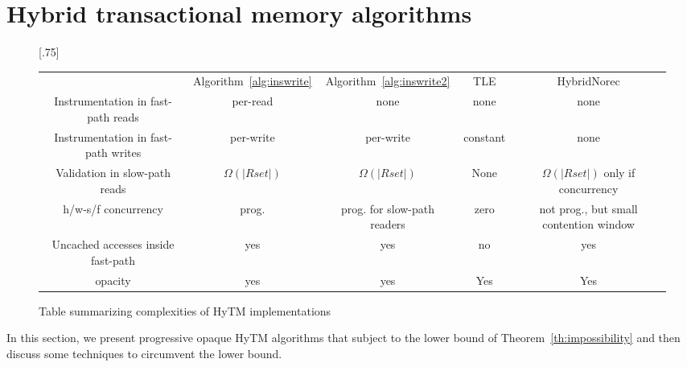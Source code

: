 \section{Hybrid transactional memory algorithms}\label{sec:hytmalgos}
%
\begin{figure*}[!t]
      
     \scalebox{.75}[.75]{
     \begin{tabularx}{\textwidth}{c|c|c|c|c}
	~~~~~ & Algorithm~\ref{alg:inswrite} & Algorithm~\ref{alg:inswrite2} & TLE & HybridNorec\\ 
	Instrumentation in fast-path reads & per-read & none & none & none \\ 
	Instrumentation in fast-path writes & per-write & per-write & constant & none \\ 
	Validation in slow-path reads & $\Omega(|Rset|)$ & $\Omega(|Rset|)$ & None & $\Omega(|Rset|)$ only if concurrency \\ 
	h/w-s/f concurrency & prog. & prog. for slow-path readers & zero & not prog., but small contention window \\ 
	Uncached accesses inside fast-path & yes & yes & no & yes \\ 
	opacity & yes & yes & Yes & Yes 
   \end{tabularx}
\caption{Table summarizing complexities of HyTM implementations}\label{fig:main}    
}
\end{figure*}
%
In this section, we present progressive opaque HyTM algorithms that subject to the lower bound
of Theorem~\ref{th:impossibility} and then discuss some techniques to circumvent the lower bound.
%

%
%